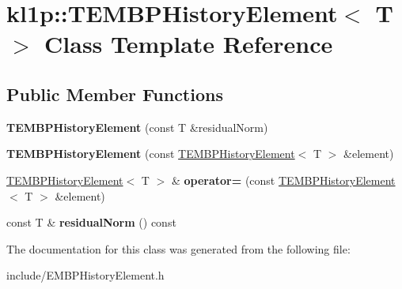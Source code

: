 \hypertarget{classkl1p_1_1TEMBPHistoryElement}{}\section{kl1p\+:\+:T\+E\+M\+B\+P\+History\+Element$<$ T $>$ Class Template Reference}
\label{classkl1p_1_1TEMBPHistoryElement}
\subsection*{Public Member Functions}
\begin{DoxyCompactItemize}
\item 
{\bfseries T\+E\+M\+B\+P\+History\+Element} (const T \&residual\+Norm)\hypertarget{classkl1p_1_1TEMBPHistoryElement_ada9e3887c38f64fb3ef89c05378f91bc}{}\label{classkl1p_1_1TEMBPHistoryElement_ada9e3887c38f64fb3ef89c05378f91bc}

\item 
{\bfseries T\+E\+M\+B\+P\+History\+Element} (const \hyperlink{classkl1p_1_1TEMBPHistoryElement}{T\+E\+M\+B\+P\+History\+Element}$<$ T $>$ \&element)\hypertarget{classkl1p_1_1TEMBPHistoryElement_a01554a366a628c102929c8e264383320}{}\label{classkl1p_1_1TEMBPHistoryElement_a01554a366a628c102929c8e264383320}

\item 
\hyperlink{classkl1p_1_1TEMBPHistoryElement}{T\+E\+M\+B\+P\+History\+Element}$<$ T $>$ \& {\bfseries operator=} (const \hyperlink{classkl1p_1_1TEMBPHistoryElement}{T\+E\+M\+B\+P\+History\+Element}$<$ T $>$ \&element)\hypertarget{classkl1p_1_1TEMBPHistoryElement_ae9c79886fc15aaa86b764db52a04cf68}{}\label{classkl1p_1_1TEMBPHistoryElement_ae9c79886fc15aaa86b764db52a04cf68}

\item 
const T \& {\bfseries residual\+Norm} () const \hypertarget{classkl1p_1_1TEMBPHistoryElement_abda34c2aff6396bb43ff6ef2753cfc34}{}\label{classkl1p_1_1TEMBPHistoryElement_abda34c2aff6396bb43ff6ef2753cfc34}

\end{DoxyCompactItemize}


The documentation for this class was generated from the following file\+:\begin{DoxyCompactItemize}
\item 
include/E\+M\+B\+P\+History\+Element.\+h\end{DoxyCompactItemize}
